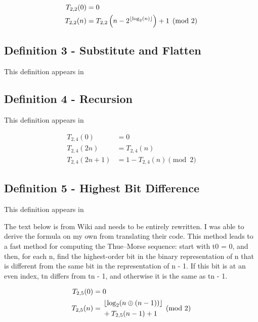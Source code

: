 \documentclass[conference]{IEEEtran}
\begin{document}
\begin{equation}
    \begin{aligned}
        T_{2,2}(0) &= 0 \\
        T_{2,2}(n) &= T_{2,2}\left(n - 2^{\left\lfloor \log_2(n) \right\rfloor}\right) + 1 \pmod{2}
    \end{aligned}
\end{equation}

\subsection{Definition 3 - Substitute and Flatten}

This definition appears in \cite{Spiegelhofer_2020, Kolář-Nori_1991}

\subsection{Definition 4 - Recursion}

This definition appears in \cite{Kolář-Nori_1991}

\begin{equation}
    \begin{aligned}
        T_{2,4}(0) &= 0 \\
        T_{2,4}(2n) &= T_{2,4}(n) \\
        T_{2,4}(2n+1) &= 1 - T_{2,4}(n) \pmod{2}
    \end{aligned}
\end{equation}

\subsection{Definition 5 - Highest Bit Difference}

This definition appears in \cite{Arndt_2010}

The text below is from Wiki and needs to be entirely rewritten. I was able to derive the formula on my own from translating their code.
This method leads to a fast method for computing the Thue–Morse sequence: start with t0 = 0, and then, for each n, find the highest-order bit in the binary representation of n that is different from the same bit in the representation of n - 1. If this bit is at an even index, tn differs from tn - 1, and otherwise it is the same as tn - 1.

\begin{equation}
    \begin{aligned}
        T_{2,5}(0) &= 0 \\
        T_{2,5}(n) &= \begin{aligned}[c]
            &\left\lfloor \log_2(n \oplus (n - 1)) \right\rfloor \\
            &+ T_{2,5}(n - 1) + 1
        \end{aligned} \pmod{2}
    \end{aligned}
\end{equation}
\end{document}
